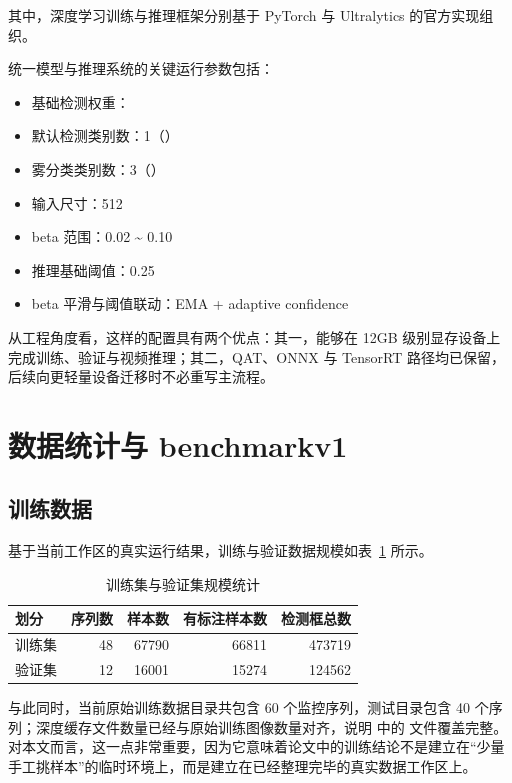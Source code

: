 其中，深度学习训练与推理框架分别基于 PyTorch 与 Ultralytics 的官方实现组织\cite{pytorchDocs,ultralyticsDocs}。

统一模型与推理系统的关键运行参数包括：

\begin{itemize}[leftmargin=2em]
\item 基础检测权重：
\item 默认检测类别数：1（）
\item 雾分类类别数：3（）
\item 输入尺寸：512
\item beta 范围：0.02 \textasciitilde{} 0.10
\item 推理基础阈值：0.25
\item beta 平滑与阈值联动：EMA + adaptive confidence
\end{itemize}

从工程角度看，这样的配置具有两个优点：其一，能够在 12GB 级别显存设备上完成训练、验证与视频推理；其二，QAT、ONNX 与 TensorRT 路径均已保留，后续向更轻量设备迁移时不必重写主流程。

\section[数据统计与 benchmark\textunderscore{}v1]{数据统计与 benchmark\textunderscore{}v1}

\subsection{训练数据}

基于当前工作区的真实运行结果，训练与验证数据规模如表~\ref{tab:dataset_split_stats} 所示。

\begin{table}[htbp]
  \centering
  \caption{训练集与验证集规模统计}
  \label{tab:dataset_split_stats}
  \small
  \begin{tabular}{@{}lrrrr@{}}
    \toprule
    划分 & 序列数 & 样本数 & 有标注样本数 & 检测框总数 \\
    \midrule
    训练集 & 48 & 67790 & 66811 & 473719 \\
    验证集 & 12 & 16001 & 15274 & 124562 \\
    \bottomrule
  \end{tabular}
\end{table}

与此同时，当前原始训练数据目录共包含 60 个监控序列，测试目录包含 40 个序列；深度缓存文件数量已经与原始训练图像数量对齐，说明  中的  文件覆盖完整。对本文而言，这一点非常重要，因为它意味着论文中的训练结论不是建立在“少量手工挑样本”的临时环境上，而是建立在已经整理完毕的真实数据工作区上。


